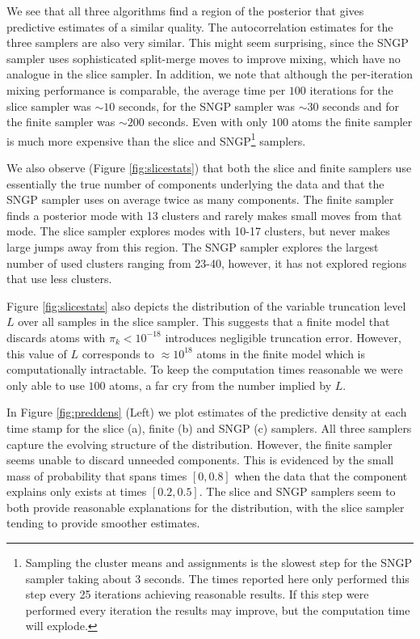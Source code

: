 We see that all three algorithms find a region of the posterior that gives
predictive estimates of a similar quality.  The autocorrelation estimates for 
the three samplers are also very similar. This might seem surprising, since the 
SNGP sampler uses sophisticated split-merge moves
to improve mixing, which have no analogue in the slice sampler. 
In addition, we note that although the per-iteration mixing performance is comparable, the average
time per $100$ iterations for the slice sampler was 
$\sim 10$ %
seconds, for
the SNGP sampler was 
$\sim 30$ %
seconds and for the finite sampler was 
$\sim 200$ %
seconds. Even with only $100$ atoms the finite sampler
is much more expensive than the slice and SNGP\footnote{Sampling the cluster means
and assignments is the slowest step for the SNGP sampler taking about 3 seconds.
The times reported here only performed this step every 25 iterations
achieving reasonable results.  If this step were performed every iteration the
results may improve, but the computation time will explode.} samplers.

We also observe (Figure
\ref{fig:slicestats}) that both the slice and finite samplers
use essentially the true number of components underlying the data and that 
the SNGP sampler uses on average twice as many components.  The finite sampler finds a posterior mode with 13 clusters and rarely makes small moves from that
mode.  The slice sampler explores modes with 10-17 clusters, but never makes
large jumps away from this region.  The SNGP sampler explores the largest
number of used clusters ranging from 23-40, however, it has not explored
regions that use less clusters.

Figure \ref{fig:slicestats} also depicts the distribution
of the variable truncation level $L$ over all samples in the slice sampler. This suggests that a finite model that discards atoms with $\pi_k <
10^{-18}$ introduces negligible truncation error.  However, this value of $L$
corresponds to $\approx 10^{18}$ atoms in the finite model which is
computationally intractable.  To keep the computation times
reasonable we were only able to use $100$ atoms, a far cry
from the number implied by $L$.  

In Figure \ref{fig:preddens} (Left) we plot estimates of the predictive density
at each time stamp for the slice (a), finite (b) and SNGP (c) samplers.  All
three samplers capture the evolving structure of the distribution.  However,
the finite sampler seems unable to discard unneeded components.  This
is evidenced by the small mass of probability that spans times $[0,0.8]$ when
the data that the component explains only exists at times $[0.2,0.5]$.
The slice and SNGP samplers seem to both provide reasonable explanations for
the distribution, with the slice sampler tending to provide smoother estimates.

